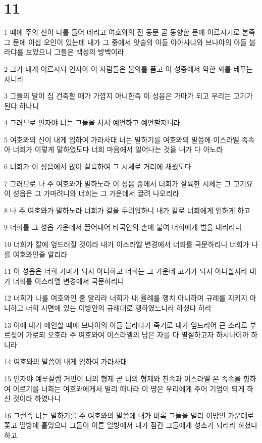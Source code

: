 \chapter{11}

\par 1 때에 주의 신이 나를 들어 데리고 여호와의 전 동문 곧 동향한 문에 이르시기로 본즉 그 문에 이십 오인이 있는데 내가 그 중에서 앗술의 아들 야아사냐와 브나야의 아들 블라댜를 보았으니 그들은 백성의 방백이라
\par 2 그가 내게 이르시되 인자야 이 사람들은 불의를 품고 이 성중에서 악한 꾀를 베푸는 자니라
\par 3 그들의 말이 집 건축할 때가 가깝지 아니한즉 이 성읍은 가마가 되고 우리는 고기가 된다 하나니
\par 4 그러므로 인자야 너는 그들을 쳐서 예언하고 예언할지니라
\par 5 여호와의 신이 내게 임하여 가라사대 너는 말하기를 여호와의 말씀에 이스라엘 족속아 너희가 이렇게 말하였도다 너희 마음에서 일어나는 것을 내가 다 아노라
\par 6 너희가 이 성읍에서 많이 살륙하여 그 시체로 거리에 채웠도다
\par 7 그러므로 나 주 여호와가 말하노라 이 성읍 중에서 너희가 살륙한 시체는 그 고기요 이 성읍은 그 가마려니와 너희는 그 가운데서 끌려 나오리라
\par 8 나 주 여호와가 말하노라 너희가 칼을 두려워하니 내가 칼로 너희에게 임하게 하고
\par 9 너희를 그 성읍 가운데서 끌어내어 타국인의 손에 붙여 너희에게 벌을 내리리니
\par 10 너희가 칼에 엎드러질 것이라 내가 이스라엘 변경에서 너희를 국문하리니 너희가 나를 여호와인줄 알리라
\par 11 이 성읍은 너희 가마가 되지 아니하고 너희는 그 가운데 고기가 되지 아니할지라 내가 너희를 이스라엘 변경에서 국문하리니
\par 12 너희가 나를 여호와인 줄 알리라 너희가 내 율례를 행치 아니하며 규례를 지키지 아니하고 너희 사면에 있는 이방인의 규례대로 행하였느니라 하셨다 하라
\par 13 이에 내가 예언할 때에 브나야의 아들 블라댜가 죽기로 내가 엎드리어 큰 소리로 부르짖어 가로되 오호라 주 여호와여 이스라엘의 남은 자를 다 멸절하고자 하시나이까 하니라
\par 14 여호와의 말씀이 내게 임하여 가라사대
\par 15 인자야 예루살렘 거민이 너의 형제 곧 너의 형제와 친속과 이스라엘 온 족속을 향하여 이르기를 너희는 여호와에게서 멀리 떠나라 이 땅은 우리에게 주어 기업이 되게 하신 것이라 하였나니
\par 16 그런즉 너는 말하기를 주 여호와의 말씀에 내가 비록 그들을 멀리 이방인 가운데로 쫓고 열방에 흩었으나 그들이 이른 열방에서 내가 잠간 그들에게 성소가 되리라 하셨다 하고
